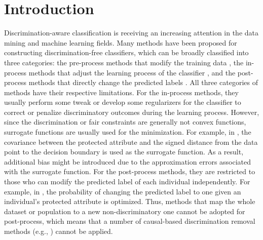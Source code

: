 \documentclass{article}
\begin{document}
\section{Introduction}
Discrimination-aware classification is receiving an increasing attention in the data mining and machine learning fields. Many methods have been proposed for constructing discrimination-free classifiers, which can be broadly classified into three categories: the pre-process methods that modify the training data \cite{kamiran2009classifying,feldman2015certifying,zhang2017causal,calmon2017optimized,nabi2017fair}, the in-process methods that adjust the learning process of the classifier \cite{calders2010three,kamishima2011fairness,kamishima2012fairness,zafar2017fairness}, and the post-process methods that directly change the predicted labels \cite{kamiran2010discrimination,hardt2016equality}. All three categories of methods have their respective limitations. For the in-process methods, they usually perform some tweak or develop some regularizers for the classifier to correct or penalize discriminatory outcomes during the learning process. However, since the discrimination or fair constraints are generally not convex functions, surrogate functions are usually used for the minimization. For example, in \cite{zafar2017fairness}, the covariance between the protected attribute and the signed distance from the data point to the decision boundary is used as the surrogate function. As a result, additional bias might be introduced due to the approximation errors associated with the surrogate function. For the post-process methods, they are restricted to those who can modify the predicted label of each individual independently. For example, in \cite{hardt2016equality}, the probability of changing the predicted label to one given an individual's protected attribute is optimized. Thus, methods that map the whole dataset or population to a new non-discriminatory one cannot be adopted for post-process, which means that a number of causal-based discrimination removal methods (e.g., \cite{zhang2017causal,nabi2017fair}) cannot be applied.
\end{document}
